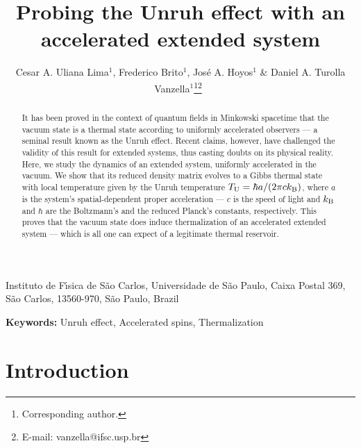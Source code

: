 \documentclass[]{nature}
\begin{document}
\title{Probing the Unruh effect with an accelerated extended system}

\author{Cesar A. Uliana Lima$^{1}$\hspace{.2pc},
              Frederico Brito$^{1}$\hspace{.2pc},
              Jos\'{e} A. Hoyos$^{1}$\hspace{.2pc} \&
              Daniel A. Turolla Vanzella$^{1}$\thanks{Corresponding author.}\hspace{.4pc}\thanks{E-mail: vanzella@ifsc.usp.br}~\hspace{.2pc}
    }

\maketitle 

\begin{affiliations}
  \item 
    Instituto de F\'{\i}sica de S{\~{a}}o Carlos, Universidade de S{\~{a}}o Paulo\unskip, Caixa Postal 369\unskip, S{\~{a}}o Carlos\unskip, 13560-970\unskip, S{\~{a}}o Paulo\unskip, Brazil
\end{affiliations}
        

\begin{abstract}
It has been proved in the context of  quantum fields
in Minkowski spacetime that the vacuum state
is a  thermal  state according to uniformly accelerated observers --- a  seminal result known as 
the Unruh effect. 
Recent claims, however, have challenged the validity of this result for
extended systems, thus casting doubts on its physical reality. Here, we study the dynamics of an
 extended system,
uniformly accelerated
in the vacuum.
We show that its reduced density matrix evolves to a 
Gibbs thermal state with local temperature given by the Unruh 
temperature  $T_{\rm U} = \hbar a/(2\pi c k_{\rm B})$, 
where $a$ is the system's spatial-dependent
proper acceleration
— $c$ is the speed of light and $k_{\rm B}$ and $\hbar$ are the Boltzmann's and the reduced Planck's constants, respectively.
This proves that 
the vacuum state does induce thermalization 
of an accelerated extended system --- which is all one can expect of a legitimate thermal reservoir.
\end{abstract}\def\keywordstitle{Keywords}

    \textbf{\keywordstitle:} Unruh effect, Accelerated spins, Thermalization
    
    
\section{Introduction}
\end{document}
